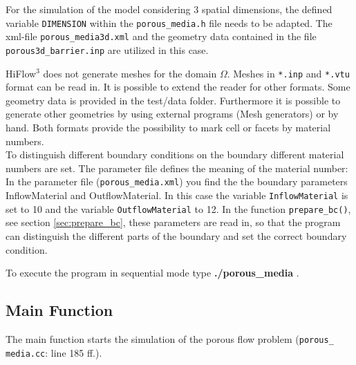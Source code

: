 \documentclass{article}
\begin{document}
For the simulation of the model considering 3 spatial dimensions, the defined variable \texttt{DIMENSION} within the \texttt{porous\_media.h} file needs to be adapted. The xml-file \texttt{porous\_media3d.xml} and the geometry data contained in the file \texttt{porous3d\_barrier.inp} are utilized in this case.

HiFlow$^\text{3}$ does not generate meshes for the domain $\Omega$. Meshes in \texttt{*.inp} and \texttt{*.vtu}  format can be read in. It is possible to extend the reader for other formats. Some geometry data is provided in the test/data folder. Furthermore it is possible to generate other geometries by using external programs (Mesh generators) or by hand. Both formats provide the possibility to mark cell or facets by material numbers.\\
To distinguish different boundary conditions on the boundary different material numbers are set. The parameter file defines the meaning of the material number: In the parameter file (\texttt{porous\_media.xml}) you find the the boundary parameters InflowMaterial and OutflowMaterial. In this case
the variable \texttt{InflowMaterial} is set to 10 and the variable \texttt{OutflowMaterial} to 12. In the function
\texttt{prepare\_bc()}, see section \ref{sec:prepare_bc}, these parameters are read in, so that the program can distinguish the different parts of the boundary and set the correct boundary condition.

To execute the program in sequential mode type \textbf{./porous\_media} .


\subsection{Main Function}

The main function starts the simulation of the porous flow problem (\texttt{porous\_ media.cc}: line 185 ff.).
\end{document}
